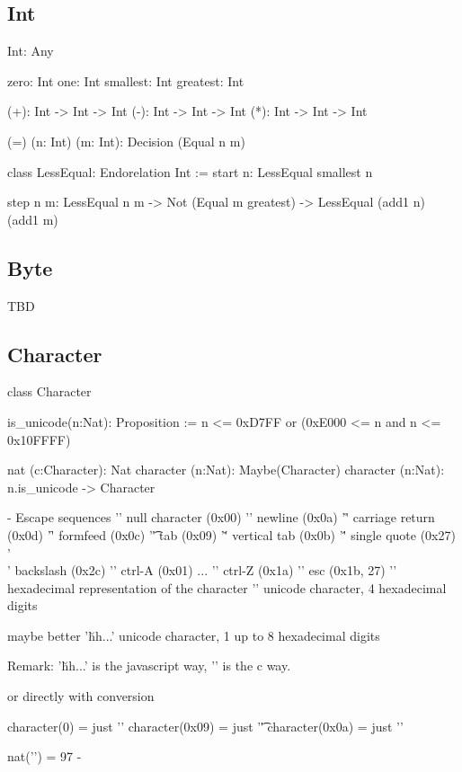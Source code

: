\subsection{Int}

\begin{alba}
    Int: Any

    zero: Int
    one:  Int
    smallest: Int
    greatest: Int

    (+): Int -> Int -> Int
    (-): Int -> Int -> Int
    (*): Int -> Int -> Int

    (=) (n: Int) (m: Int): Decision (Equal n m)

    class
        LessEqual: Endorelation Int
    :=
        start {n}:
            LessEqual smallest n

        step {n m}:
            LessEqual n m
            -> Not (Equal m greatest)
            -> LessEqual (add1 n) (add1 m)
\end{alba}





\vskip 5mm
\subsection{Byte}

TBD




\subsection{Character}

\begin{alba}
  class Character

  is_unicode(n:Nat): Proposition :=
    n <= 0xD7FF or (0xE000 <= n and n <= 0x10FFFF)

  nat (c:Character): Nat
  character (n:Nat): Maybe(Character)
  character (n:Nat): n.is_unicode -> Character

  {- Escape sequences
    '\0'          null character (0x00)
    '\n'          newline (0x0a)
    '\r'          carriage return (0x0d)
    '\f'          formfeed (0x0c)
    '\t'          tab (0x09)
    '\v'          vertical tab (0x0b)
    '\''          single quote (0x27)
    '\\'          backslash (0x2c)
    '\cA'         ctrl-A (0x01)
    ...
    '\cZ'         ctrl-Z (0x1a)
    '\e'          esc (0x1b, 27)
    '\xhh'        hexadecimal representation of the character
    '\uhhhh'      unicode character, 4 hexadecimal digits

    maybe better
    '\u{hh...}'   unicode character, 1 up to 8 hexadecimal digits

    Remark: '\u{hh...}' is the javascript way, '\Uhhhhhhhh' is the c way.


    or directly with conversion

    character(0)  =   just '\0'
    character(0x09) = just '\t'
    character(0x0a) = just '\n'

    nat('\a')  = 97
  -}
\end{alba}


